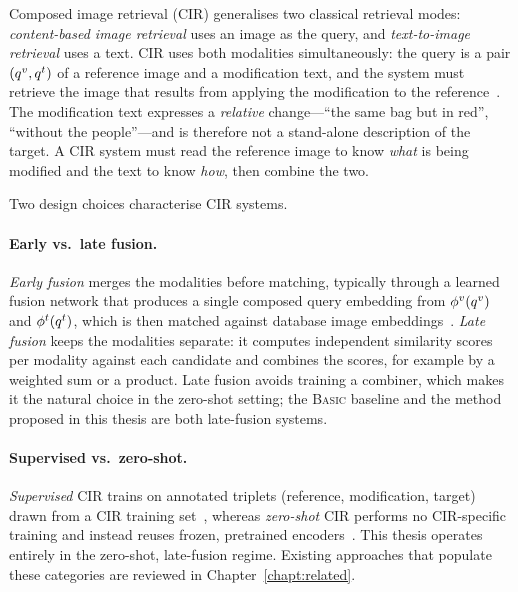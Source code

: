 Composed image retrieval (CIR) generalises two classical retrieval modes:
\emph{content-based image retrieval} uses an image as the query, and
\emph{text-to-image retrieval} uses a text. CIR uses both modalities
simultaneously: the query is a pair $(q^{v}, q^{t})$ of a reference image and a
modification text, and the system must retrieve the image that results from
applying the modification to the reference~\cite{vo2019tirg}. The modification
text expresses a \emph{relative} change---``the same bag but in red'', ``without
the people''---and is therefore not a stand-alone description of the target. A
CIR system must read the reference image to know \emph{what} is being modified
and the text to know \emph{how}, then combine the two.

Two design choices characterise CIR systems.

\paragraph{Early vs.\ late fusion.} \emph{Early fusion} merges the modalities
before matching, typically through a learned fusion network that produces a
single composed query embedding from $\phi^{v}(q^{v})$ and $\phi^{t}(q^{t})$, which is
then matched against database image embeddings~\cite{vo2019tirg}. \emph{Late
fusion} keeps the modalities separate: it computes independent similarity scores
per modality against each candidate and combines the scores, for example by a
weighted sum or a product. Late fusion avoids training a combiner, which makes
it the natural choice in the zero-shot setting; the \textsc{Basic} baseline and
the method proposed in this thesis are both late-fusion systems.

\paragraph{Supervised vs.\ zero-shot.} \emph{Supervised} CIR trains on
annotated triplets (reference, modification, target) drawn from a CIR training
set~\cite{vo2019tirg,liu2021cirr}, whereas \emph{zero-shot} CIR performs no
CIR-specific training and instead reuses frozen, pretrained
encoders~\cite{saito2023pic2word,baldrati2023circo}. This thesis operates
entirely in the zero-shot, late-fusion regime. Existing approaches that populate
these categories are reviewed in Chapter~\ref{chapt:related}.


